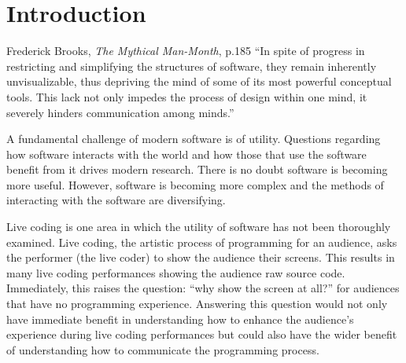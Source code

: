 
\chapter{Introduction}
\label{chap:introduction}

\begin{chapquote}{Frederick Brooks, \textit{The Mythical Man-Month}, p.185}
``In spite of progress in restricting and simplifying the structures of software, they remain inherently unvisualizable, thus depriving the mind of some of its most powerful conceptual tools. This lack not only impedes the process of design within one mind, it severely hinders communication among minds.''
\end{chapquote}


A fundamental challenge of modern software is of utility. Questions regarding how software interacts with the world and how those that use the software benefit from it drives modern research. There is no doubt software is becoming more useful. However, software is becoming more complex and the methods of interacting with the software are diversifying.

Live coding is one area in which the utility of software has not been thoroughly examined. Live coding, the artistic process of programming for an audience, asks the performer (the live coder) to show the audience their screens. This results in many live coding performances showing the audience raw source code. Immediately, this raises the question: ``why show the screen at all?'' for audiences that have no programming experience. Answering this question would not only have immediate benefit in understanding how to enhance the audience's experience during live coding performances but could also have the wider benefit of understanding how to communicate the programming process.








